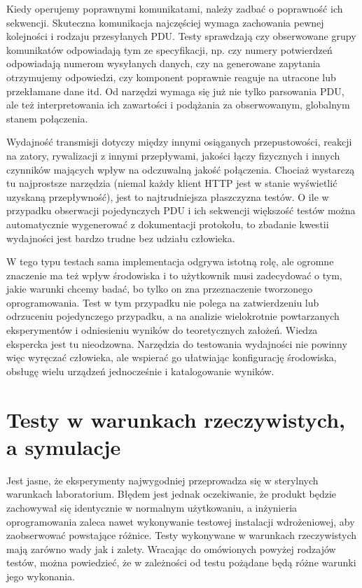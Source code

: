 \documentclass[00-praca-magisterska.tex]{subfiles}
\begin{document}
Kiedy operujemy poprawnymi komunikatami, należy zadbać o poprawność ich
sekwencji. Skuteczna komunikacja najczęściej wymaga zachowania pewnej
kolejności i rodzaju przesyłanych PDU. Testy sprawdzają czy obserwowane grupy
komunikatów odpowiadają tym ze specyfikacji, np. czy numery potwierdzeń
odpowiadają numerom wysyłanych danych, czy na generowane zapytania otrzymujemy
odpowiedzi, czy komponent poprawnie reaguje na utracone lub przekłamane dane
itd. Od narzędzi wymaga się już nie tylko parsowania PDU, ale też
interpretowania ich zawartości i podążania za obserwowanym, globalnym stanem
połączenia.

Wydajność transmisji dotyczy między innymi osiąganych przepustowości, reakcji
na zatory, rywalizacji z innymi przepływami, jakości łączy fizycznych i innych
czynników mających wpływ na odczuwalną jakość połączenia. Chociaż wystarczą tu
najprostsze narzędzia (niemal każdy klient HTTP jest w stanie wyświetlić
uzyskaną przepływność), jest to najtrudniejsza płaszczyzna testów. O ile w
przypadku obserwacji pojedynczych PDU i ich sekwencji większość testów można
automatycznie wygenerować z dokumentacji protokołu, to zbadanie kwestii
wydajności jest bardzo trudne bez udziału człowieka.

W tego typu testach sama implementacja odgrywa istotną rolę, ale ogromne
znaczenie ma też wpływ środowiska i to użytkownik musi zadecydować o tym, jakie
warunki chcemy badać, bo tylko on zna przeznaczenie tworzonego oprogramowania.
Test w tym przypadku nie polega na zatwierdzeniu lub odrzuceniu pojedynczego
przypadku, a na analizie wielokrotnie powtarzanych eksperymentów i odniesieniu
wyników do teoretycznych założeń. Wiedza ekspercka jest tu nieodzowna.
Narzędzia do testowania wydajności nie powinny więc wyręczać człowieka, ale
wspierać go ułatwiając konfigurację środowiska, obsługę wielu urządzeń
jednocześnie i katalogowanie wyników.

\section{Testy w warunkach rzeczywistych, a symulacje}
\label{testy-w-warunkach-rzeczywistych-a-symulacje}

Jest jasne, że eksperymenty najwygodniej przeprowadza się w sterylnych
warunkach laboratorium. Błędem jest jednak oczekiwanie, że produkt będzie
zachowywał się identycznie w normalnym użytkowaniu, a inżynieria oprogramowania
zaleca nawet wykonywanie testowej instalacji wdrożeniowej, aby zaobserwować
powstające różnice. Testy wykonywane w warunkach rzeczywistych mają zarówno
wady jak i zalety.  Wracając do omówionych powyżej rodzajów testów, można
powiedzieć, że w zależności od testu pożądane będą różne warunki jego
wykonania.
\end{document}
